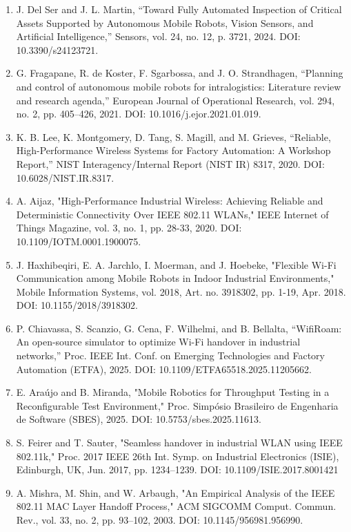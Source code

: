 \begin{enumerate}
\def\labelenumi{\arabic{enumi}.}
\item
  J. Del Ser and J. L. Martin, ``Toward Fully Automated Inspection of Critical Assets Supported by Autonomous Mobile Robots, Vision Sensors, and Artificial Intelligence,'' Sensors, vol. 24, no. 12, p. 3721, 2024. DOI: 10.3390/s24123721.
\item
  G. Fragapane, R. de Koster, F. Sgarbossa, and J. O. Strandhagen, ``Planning and control of autonomous mobile robots for intralogistics: Literature review and research agenda,'' European Journal of Operational Research, vol. 294, no. 2, pp. 405--426, 2021. DOI: 10.1016/j.ejor.2021.01.019.
\item
  K. B. Lee, K. Montgomery, D. Tang, S. Magill, and M. Grieves, ``Reliable, High-Performance Wireless Systems for Factory Automation: A Workshop Report,'' NIST Interagency/Internal Report (NIST IR) 8317, 2020. DOI: 10.6028/NIST.IR.8317.
\item
  A. Aijaz, "High-Performance Industrial Wireless: Achieving Reliable and Deterministic Connectivity Over IEEE 802.11 WLANs," IEEE Internet of Things Magazine, vol. 3, no. 1, pp. 28-33, 2020. DOI: 10.1109/IOTM.0001.1900075.
\item
  J. Haxhibeqiri, E. A. Jarchlo, I. Moerman, and J. Hoebeke, "Flexible Wi-Fi Communication among Mobile Robots in Indoor Industrial Environments," Mobile Information Systems, vol. 2018, Art. no. 3918302, pp. 1-19, Apr. 2018. DOI: 10.1155/2018/3918302.
\item
  P. Chiavassa, S. Scanzio, G. Cena, F. Wilhelmi, and B. Bellalta, ``WifiRoam: An open-source simulator to optimize Wi-Fi handover in industrial networks,'' Proc. IEEE Int. Conf. on Emerging Technologies and Factory Automation (ETFA), 2025. DOI: 10.1109/ETFA65518.2025.11205662.
\item
  E. Araújo and B. Miranda, "Mobile Robotics for Throughput Testing in a Reconfigurable Test Environment," Proc. Simpósio Brasileiro de Engenharia de Software (SBES), 2025. DOI: 10.5753/sbes.2025.11613.
\item
  S. Feirer and T. Sauter, "Seamless handover in industrial WLAN using IEEE 802.11k," Proc. 2017 IEEE 26th Int. Symp. on Industrial Electronics (ISIE), Edinburgh, UK, Jun. 2017, pp. 1234--1239. DOI: 10.1109/ISIE.2017.8001421
\item
  A. Mishra, M. Shin, and W. Arbaugh, "An Empirical Analysis of the IEEE 802.11 MAC Layer Handoff Process," ACM SIGCOMM Comput. Commun. Rev., vol. 33, no. 2, pp. 93--102, 2003. DOI: 10.1145/956981.956990.

\end{enumerate}
